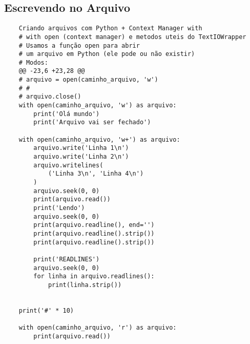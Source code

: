 \documentclass{article}
\begin{document}
\subsection{Escrevendo no Arquivo}
\begin{lstlisting}
    Criando arquivos com Python + Context Manager with
    # with open (context manager) e metodos uteis do TextIOWrapper
    # Usamos a função open para abrir
    # um arquivo em Python (ele pode ou não existir)
    # Modos:
    @@ -23,6 +23,28 @@
    # arquivo = open(caminho_arquivo, 'w')
    # #
    # arquivo.close()
    with open(caminho_arquivo, 'w') as arquivo:
        print('Olá mundo')
        print('Arquivo vai ser fechado')
    
    with open(caminho_arquivo, 'w+') as arquivo:
        arquivo.write('Linha 1\n')
        arquivo.write('Linha 2\n')
        arquivo.writelines(
            ('Linha 3\n', 'Linha 4\n')
        )
        arquivo.seek(0, 0)
        print(arquivo.read())
        print('Lendo')
        arquivo.seek(0, 0)
        print(arquivo.readline(), end='')
        print(arquivo.readline().strip())
        print(arquivo.readline().strip())
    
        print('READLINES')
        arquivo.seek(0, 0)
        for linha in arquivo.readlines():
            print(linha.strip())
    
    
    print('#' * 10)
    
    with open(caminho_arquivo, 'r') as arquivo:
        print(arquivo.read())
\end{lstlisting}
\end{document}
